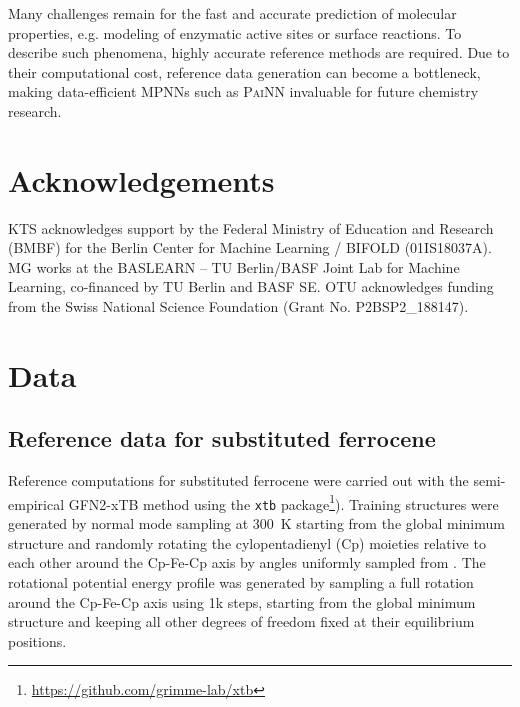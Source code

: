 \documentclass[reprint,
amsmath,amssymb,
 aip,jcp
]{revtex4-2}
\newcommand{\painn}{\textsc{PaiNN}}
\begin{document}
Many challenges remain for the fast and accurate prediction of molecular properties, e.g.  modeling of enzymatic active sites or surface reactions.
To describe such phenomena, highly accurate reference methods are required. Due to their computational cost, reference data generation can become a bottleneck, making data-efficient MPNNs such as \painn{} invaluable for future chemistry research.

\section*{Acknowledgements}
KTS acknowledges support by the Federal Ministry of Education and Research (BMBF) for the Berlin Center for Machine Learning / BIFOLD (01IS18037A).
MG works at the BASLEARN – TU Berlin/BASF Joint Lab for Machine Learning, co-financed by TU Berlin and BASF SE.
OTU acknowledges funding from the Swiss National Science Foundation (Grant No. P2BSP2\_188147).




\renewcommand{\thefigure}{\arabic{figure}}
\renewcommand{\thetable}{\arabic{table}}
\renewcommand{\figurename}{Supplementary Figure}
\renewcommand{\tablename}{Supplementary Table}
\captionsetup[figure]{justification=raggedright}
\captionsetup[table]{justification=raggedright}
\clearpage
\appendix

\section{Data}

\subsection{Reference data for substituted ferrocene}

Reference computations for substituted ferrocene were carried out with the semi-empirical GFN2-xTB method\cite{bannwarth2019gfn2} using the \texttt{xtb} package\footnote{\url{https://github.com/grimme-lab/xtb}}). Training structures were generated by normal mode sampling\cite{smith2017ani} at 300~K starting from the global minimum structure and randomly rotating the cylopentadienyl (Cp) moieties relative to each other around the Cp-Fe-Cp axis by angles uniformly sampled from . The rotational potential energy profile was generated by sampling a full rotation around the Cp-Fe-Cp axis using 1k steps, starting from the global minimum structure and keeping all other degrees of freedom fixed at their equilibrium positions.
\end{document}
